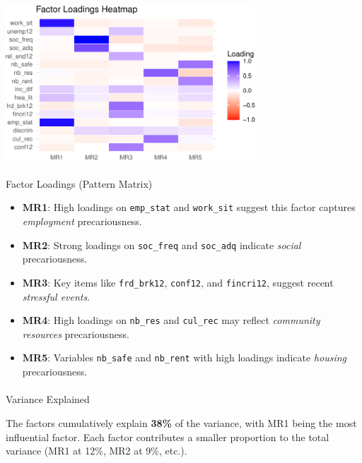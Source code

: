 \documentclass[
]{article}
\makeatletter
\let\oldparagraph\paragraph
\renewcommand{\paragraph}{
    \@ifstar
      \xxxParagraphStar
      \xxxParagraphNoStar
  }
\newcommand{\xxxParagraphStar}[1]{\oldparagraph*{#1}\mbox{}}
\newcommand{\xxxParagraphNoStar}[1]{\oldparagraph{#1}\mbox{}}
\providecommand{\tightlist}{%
  \setlength{\itemsep}{0pt}\setlength{\parskip}{0pt}}\usepackage{longtable,booktabs,array}
\makeatother
\begin{document}
\begin{center}
\includegraphics[width=0.7\textwidth,height=\textheight]{draft_v3_files/figure-pdf/unnamed-chunk-14-1.pdf}
\end{center}

\paragraph{Factor Loadings (Pattern
Matrix)}\label{factor-loadings-pattern-matrix}

\begin{itemize}
\tightlist
\item
  \textbf{MR1}: High loadings on \texttt{emp\_stat} and
  \texttt{work\_sit} suggest this factor captures \emph{employment}
  precariousness.
\item
  \textbf{MR2}: Strong loadings on \texttt{soc\_freq} and
  \texttt{soc\_adq} indicate \emph{social} precariousness.
\item
  \textbf{MR3}: Key items like \texttt{frd\_brk12}, \texttt{conf12}, and
  \texttt{fincri12}, suggest recent \emph{stressful events}.
\item
  \textbf{MR4}: High loadings on \texttt{nb\_res} and \texttt{cul\_rec}
  may reflect \emph{community resources} precariousness.
\item
  \textbf{MR5}: Variables \texttt{nb\_safe} and \texttt{nb\_rent} with
  high loadings indicate \emph{housing} precariousness.
\end{itemize}

\paragraph{Variance Explained}\label{variance-explained}

The factors cumulatively explain \textbf{38\%} of the variance, with MR1
being the most influential factor. Each factor contributes a smaller
proportion to the total variance (MR1 at 12\%, MR2 at 9\%, etc.).
\end{document}
